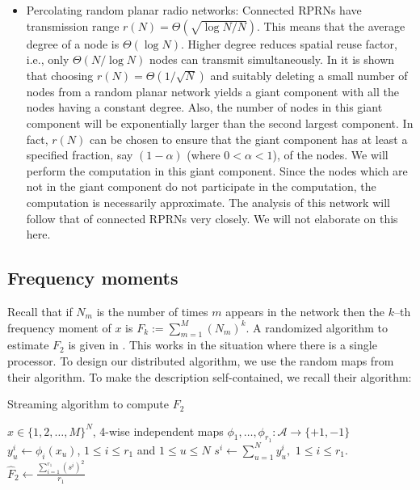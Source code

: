 \documentclass[10pt,twosided,a4paper,draft,onecolumn]{article}
\begin{document}
\begin{itemize}
\item Percolating random planar radio networks: Connected RPRNs have
  transmission range $r(N) = \Theta\left(\sqrt{\log N/N} \right).$
  This means that the average degree of a node is $\Theta(\log N).$
  Higher degree reduces spatial reuse factor, i.e., only
  $\Theta\left(N /\log N \right)$ nodes can transmit
  simultaneously. In \cite{Iyer11} it is shown that choosing $r(N) =
  \Theta(1/\sqrt{N})$ and suitably deleting a small number of nodes
  from a random planar network yields a giant component with all the
  nodes having a constant degree. Also, the number of nodes in this
  giant component will be exponentially larger than the second largest
  component. In fact, $r(N)$ can be chosen to ensure that the giant
  component has at least a specified fraction, say $(1-\alpha)$ (where
  $0 < \alpha <1$), of the nodes. We will perform the computation in
  this giant component. Since the nodes which are not in the giant
  component do not participate in the computation, the computation is
  necessarily approximate. The analysis of this network will follow
  that of connected RPRNs very closely. We will not elaborate on this
  here.
\end{itemize} 

\subsection{Frequency moments}
\label{sec:prem_fk}

Recall that if $N_m$ is the number of times $m$ appears in the network
then the $k$--th frequency moment of $x$ is $F_k:=\sum\limits_{m=1}^M
(N_m)^k.$ A randomized algorithm to estimate $F_2$ is given in
\cite{Alon96}. This works in the situation where there is a single
processor. To design our distributed algorithm, we use the random maps
from their algorithm. To make the description self-contained, we
recall their algorithm:
\begin{algorithm} 
  \caption{Streaming algorithm to compute $F_2$}{\label{alg:f2_stream}} 
  \begin{algorithmic}[1]
    \REQUIRE $x \in \{1,2,\ldots,M\}^N$,  4-wise independent maps
    $\phi_1, \ldots ,\phi_{r_1} : \mathcal{A} \rightarrow \{+1,-1\}$  
    \STATE  $y_u^i \gets \phi_{i}(x_u)$, $1 \leq i \leq r_1$ and $1
    \leq u \leq N$ 
    \STATE $s^i \gets \sum\limits_{u=1}^N y_u^i,$  $1 \leq i \leq
    r_1.$ 
    \STATE  $\hat{F}_2 \gets \frac{\sum\limits_{i=1}^{r_1} (s^i)^2}{r_1}$ 
  \end{algorithmic}
\end{algorithm}
\end{document}
